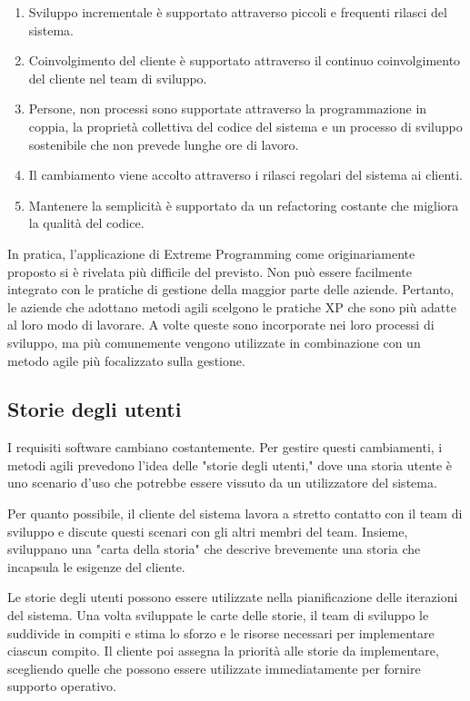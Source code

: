\begin{enumerate}
    \item Sviluppo incrementale è supportato attraverso piccoli e frequenti rilasci del sistema.
    \item Coinvolgimento del cliente è supportato attraverso il continuo coinvolgimento del cliente nel team di sviluppo.
    \item Persone, non processi sono supportate attraverso la programmazione in coppia, la proprietà collettiva del codice del sistema e un processo di sviluppo sostenibile che non prevede lunghe ore di lavoro.
    \item Il cambiamento viene accolto attraverso i rilasci regolari del sistema ai clienti.
    \item Mantenere la semplicità è supportato da un refactoring costante che migliora la qualità del codice.
\end{enumerate}
In pratica, l'applicazione di Extreme Programming come originariamente proposto si è rivelata più difficile del previsto. Non può essere facilmente integrato con le pratiche di gestione della maggior parte delle aziende. Pertanto, le aziende che adottano metodi agili scelgono le pratiche XP che sono più adatte al loro modo di lavorare. A volte queste sono incorporate nei loro processi di sviluppo, ma più comunemente vengono utilizzate in combinazione con un metodo agile più focalizzato sulla gestione.

\subsection{Storie degli utenti}
I requisiti software cambiano costantemente. Per gestire questi cambiamenti, i metodi agili prevedono l'idea delle "storie degli utenti," dove una storia utente è uno scenario d'uso che potrebbe essere vissuto da un utilizzatore del sistema.

Per quanto possibile, il cliente del sistema lavora a stretto contatto con il team di sviluppo e discute questi scenari con gli altri membri del team. Insieme, sviluppano una "carta della storia" che descrive brevemente una storia che incapsula le esigenze del cliente.

Le storie degli utenti possono essere utilizzate nella pianificazione delle iterazioni del sistema. Una volta sviluppate le carte delle storie, il team di sviluppo le suddivide in compiti e stima lo sforzo e le risorse necessari per implementare ciascun compito. Il cliente poi assegna la priorità alle storie da implementare, scegliendo quelle che possono essere utilizzate immediatamente per fornire supporto operativo.

